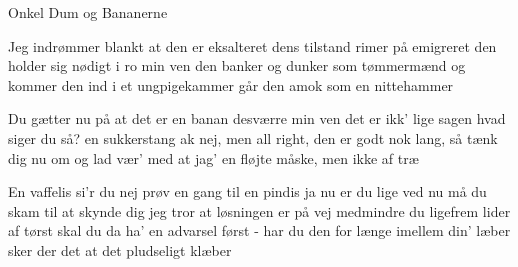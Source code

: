 {Onkel Dum og Bananerne}
{}
{

Jeg indrømmer blankt at den er eksalteret
dens tilstand rimer på emigreret
den holder sig nødigt i ro min ven
den banker og dunker som tømmermænd
og kommer den ind i et ungpigekammer
går den amok som en nittehammer


Du gætter nu på at det er en banan
desværre min ven det er ikk' lige sagen
hvad siger du så? en sukkerstang
ak nej, men all right, den er godt nok lang,
så tænk dig nu om og lad vær' med at jag'
en fløjte måske, men ikke af træ



En vaffelis si'r du nej prøv en gang til
en pindis ja nu er du lige ved
nu må du skam til at skynde dig
jeg tror at løsningen er på vej
medmindre du ligefrem lider af tørst
skal du da ha' en advarsel først -
har du den for længe imellem din' læber
sker der det at det pludseligt klæber


}


